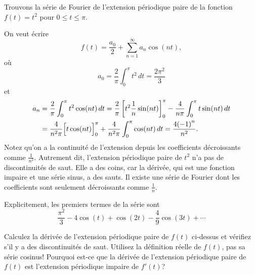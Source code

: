 
\begin{example}
Trouvons la série de Fourier de l'extension périodique paire de
la fonction $f(t) = t^2$ pour $0 \leq t \leq \pi$.

On veut écrire
\begin{equation*}
f(t) = \frac{a_0}{2} + \sum_{n=1}^\infty a_n \cos (n t) ,
\end{equation*}
où
\begin{equation*}
a_0 = \frac{2}{\pi}
\int_0^\pi t^2 \, dt = \frac{2 \pi^2}{3}
\end{equation*}
et
\begin{equation*}
\begin{split}
a_n & = \frac{2}{\pi}
\int_0^\pi t^2 \cos (n t) \, dt
= \frac{2}{\pi} \left[ t^2 \frac{1}{n} \sin (nt) \right]_0^\pi -
\frac{4}{n\pi}
\int_0^\pi t \sin (n t) \, dt \\
& = 
\frac{4}{n^2\pi}
\Bigl[ t \cos (n t) \Bigr]_0^\pi
+
\frac{4}{n^2\pi}
\int_0^\pi \cos (n t) \, dt
= 
\frac{4{(-1)}^n}{n^2} .
\end{split}
\end{equation*}
Notez qu'on a  la continuité de l'extension depuis les coefficients décroissants comme $\frac{1}{n^2}$.  %
Autrement dit, l'extension périodique paire de $t^2 $ n'a pas de discontinuités de saut. Elle a des coins, car la dérivée, qui est une fonction impaire et une série sinus, a des sauts.
Il existe une série de Fourier dont les coefficients sont seulement décroissants comme $\frac{1}{n}$.

Explicitement, les premiers termes de la série sont
\begin{equation*}
\frac{\pi^2}{3} - 4 \cos (t) + \cos (2t) - \frac{4}{9} \cos (3t) + \cdots
\end{equation*}
\end{example}

\begin{exercise}
\leavevmode
\begin{tasks}
\task Calculez la dérivée de l'extension périodique paire de $ f (t) $ ci-dessus et vérifiez s'il y a des discontinuités de saut. Utilisez la définition réelle de $ f (t) $, pas sa série cosinus!
\task Pourquoi est-ce que la dérivée de l'extension périodique paire de $ f (t) $ est l'extension périodique impaire de $ f '(t) $?
\end{tasks}
\end{exercise}

